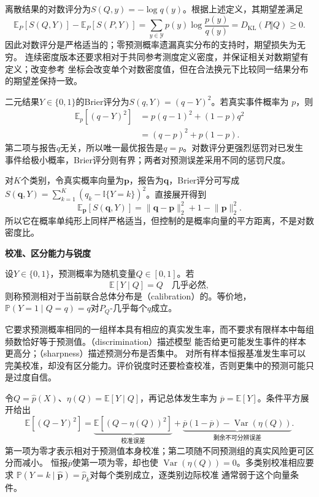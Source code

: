 离散结果的对数评分为\(S(Q,y)=-\log q(y)\)。根据上述定义，其期望差满足
\[
  \mathbb{E}_P[S(Q,Y)]-\mathbb{E}_P[S(P,Y)]
  =\sum_{y\in\mathcal Y}p(y)\log\frac{p(y)}{q(y)}
  =D_{\mathrm{KL}}(P\Vert Q)\geq0.
\]
因此对数评分是严格适当的；零预测概率遗漏真实分布的支持时，期望损失为无穷。
连续密度版本还要求相对于共同参考测度定义密度，并保证相关对数期望有定义；改变参考
坐标会改变单个对数密度值，但在合法换元下比较同一结果分布的期望差保持一致。

二元结果\(Y\in\{0,1\}\)的Brier评分为\(S(q,Y)=(q-Y)^2\)。若真实事件概率为
\(p\)，则
\begin{align}
  \mathbb{E}_p[(q-Y)^2]
  &=p(q-1)^2+(1-p)q^2\\
  &=(q-p)^2+p(1-p).
\end{align}
第二项与报告\(q\)无关，所以唯一最优报告是\(q=p\)。对数评分更强烈惩罚对已发生
事件给极小概率，Brier评分则有界；两者对预测误差采用不同的惩罚尺度。

对\(K\)个类别，令真实概率向量为\(\bm p\)，报告为\(\bm q\)，Brier评分可写成
\(S(\bm q,Y)=\sum_{k=1}^K(q_k-\mathbb{I}\{Y=k\})^2\)。直接展开得到
\[
  \mathbb{E}_{\bm p}[S(\bm q,Y)]
  =\lVert\bm q-\bm p\rVert_2^2
   +1-\lVert\bm p\rVert_2^2.
\]
所以它在概率单纯形上同样严格适当，但控制的是概率向量的平方距离，不是对数密度比。

\par\medskip\noindent\textbf{校准、区分能力与锐度}\quad
\begin{definition}[二元概率校准]
  \label{def:statistics-probability-calibration}
  设\(Y\in\{0,1\}\)，预测概率为随机变量\(Q\in[0,1]\)。若
  \[ \mathbb E[Y\mid Q]=Q\quad\text{几乎必然}, \]
  则称预测相对于当前联合总体分布是（calibration）的。等价地，\(\mathbb P(Y=1\mid Q=q)=q\)对\(P_Q\)-几乎每个\(q\)成立。
\end{definition}
它要求预测概率相同的一组样本具有相应的真实发生率，而不要求有限样本中每组频数恰好等于预测值。（discrimination）描述模型
能否给更可能发生事件的样本更高分；（sharpness）描述预测分布是否集中。
对所有样本恒报基准发生率可以完美校准，却没有区分能力。评价锐度时还要检查校准，否则更集中的预测可能只是过度自信。

令\(Q=\widehat p(X)\)、\(\eta(Q)=\mathbb{E}[Y\mid Q]\)，再记总体发生率为
\(\overline p=\mathbb{E}[Y]\)。条件平方展开给出
\[
  \mathbb{E}[(Q-Y)^2]
  =
  \underbrace{\mathbb{E}[(Q-\eta(Q))^2]}_{\text{校准误差}}
  +\underbrace{\overline p(1-\overline p)
    -\operatorname{Var}(\eta(Q))}_{\text{剩余不可分辨误差}}.
\]
第一项为零才表示相对于预测值本身校准；第二项随不同预测组的真实风险更可区分而减小。
恒报\(\overline p\)使第一项为零，却也使
\(\operatorname{Var}(\eta(Q))=0\)。多类别校准相应要求
\(\mathbb{P}(Y=k\mid\widehat{\bm p})=\widehat p_k\)对每个类别成立，逐类别边际校准
通常弱于这个向量条件。

